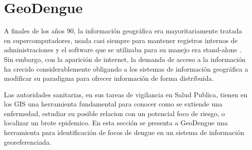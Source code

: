 \chapter{GeoDengue}
A finales de los años 90, la información geográfica era mayoritariamente tratada en
supercomputadores, usada casi siempre para mantener registros internos de administraciones y el
software que se utilizaba para su manejo era stand-alone \citep{vgomesAegis2001}. Sin embargo, con
la aparición de internet, la demanda de acceso a la información ha crecido considerablemente
obligando a los sistemas de información geográfica a modificar su paradigma para ofrecer
información de forma distribuida.

Las autoridades sanitarias, en sus tareas de vigilancia en Salud Publica, tienen en los GIS una
herramienta fundamental para conocer como se extiende una enfermedad, estudiar su posible relacion
con un potencial foco de riesgo, o localizar un brote epidemico\citep{vgomesAegis2001}. En esta
sección se presenta a GeoDengue una herramienta para identificación de focos de dengue en un
sistema de información georeferenciada.

%




%


